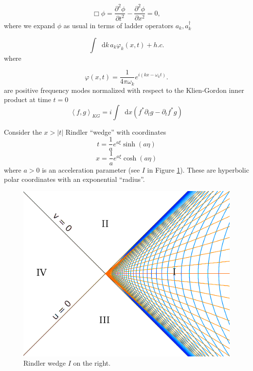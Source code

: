 \documentclass[12pt,a4paper]{article}
\newcommand*\diff{\mathop{}\!\mathrm{d}}
\begin{document}
\begin{equation}
  \Box \phi = \frac{\partial^2 \phi}{\partial t^2} - \frac{\partial^2 \phi}{\partial x^2} = 0,
 \label{massless-wave-eq}
\end{equation}
where we expand $\phi$ as usual in terms of ladder operators $a_k, a_k^\dagger$

\begin{equation}
  \int \diff k \, a_k \varphi_k(x,t) + h.c.
\end{equation}
where

\begin{equation}
  \varphi(x,t) = \frac{1}{4\pi\omega_k} e^{i(kx - \omega_k t)}.
\label{amode}
\end{equation}
are positive frequency modes normalized with respect to the Klien-Gordon inner product at time $t = 0$
\begin{equation}
  \left<f, g\right>_{KG} = i \int \diff x (f^* \partial_t g - \partial_t f^* g)
\end{equation}

Consider the $x>|t|$ Rindler ``wedge'' with coordinates
\begin{equation}
  t = \frac{1}{a}e^{a\xi}\sinh{(a\eta)}
\label{sinh}
\end{equation}
\begin{equation}
x = \frac{1}{a}e^{a\xi}\cosh{(a\eta)}
\end{equation}
where $a>0$ is an acceleration parameter (see $I$ in Figure \ref{rindlerw}). These are hyperbolic polar coordinates with an exponential ``radius''.

\begin{figure}[h]
\centering
\includegraphics[scale=0.4]{rindler_w.png}
\caption{Rindler wedge $I$ on the right.}
\label{rindlerw}
\end{figure}
\end{document}
